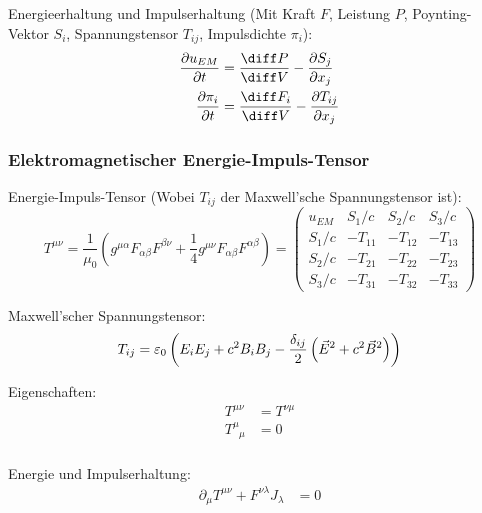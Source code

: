 \documentclass[11pt]{article}
\numberwithin{equation}{section}
\begin{document}
        Energieerhaltung und Impulserhaltung (Mit Kraft $F$, Leistung $P$, Poynting-Vektor $S_i$, Spannungstensor $T_{ij}$, Impulsdichte $\pi_i$):
        \begin{equation}
          \begin{aligned}
            \pder{u_{EM}}{t} &= \tder{P}{V} - \pder{S_j}{x_j} \\
            \pder{\pi_i}{t} &=  \tder{F_i}{V} - \pder{T_{ij}}{x_j}
          \end{aligned}
        \end{equation}

      \subsubsection{Elektromagnetischer Energie-Impuls-Tensor}
        Energie-Impuls-Tensor (Wobei $T_{ij}$ der Maxwell'sche Spannungstensor ist):
        \begin{equation}
          T^{\mu\nu} = \frac{1}{\mu_0}\left(g^{\mu\alpha} F_{\alpha\beta} F^{\beta\nu} +\frac{1}{4}g^{\mu\nu} F_{\alpha\beta} F^{\alpha\beta} \right)
          = \left( \begin{matrix}
            u_{EM} & S_1/c & S_2/c & S_3/c \\
            S_1/c & -T_{11} & -T_{12} & -T_{13} \\
            S_2/c  & -T_{21} & -T_{22} & -T_{23} \\
            S_3/c & -T_{31} & -T_{32} & -T_{33}
          \end{matrix} \right)
        \end{equation}

        Maxwell'scher Spannungstensor:
        \begin{equation}
          T_{ij} = \varepsilon_0 \left(  E_i E_j + c^2 B_i B_j - \frac{\delta_{ij}}{2}\left(  \vec{E}^2 + c^2 \vec{B}^2  \right)  \right)
        \end{equation}

        Eigenschaften:
        \begin{equation}
          \begin{aligned}
            T^{\mu\nu} &= T^{\nu\mu} \\
            T^\mu_{\phantom{\mu}\mu} &= 0 \\
          \end{aligned}
        \end{equation}

        Energie und Impulserhaltung:
        \begin{equation}
          \begin{aligned}
            \partial_\mu T^{\mu\nu} + F^{\nu\lambda} J_\lambda &= 0
          \end{aligned}
        \end{equation}
\end{document}
